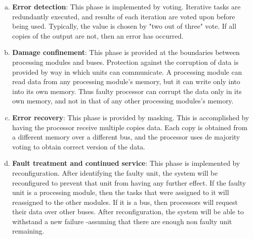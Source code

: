 \documentclass[12pt]{exam}
\begin{document}
\begin{questions}
    \begin{solution}
      \begin{enumerate}[(a)]
       \item \textbf{Error detection}: This phase is implemented by voting. Iterative tasks are redundantly executed, and results of each iteration are voted upon before being used. Typically, the value is chosen by "two out of three" vote. If all copies of the output are not, then an error has occurred.
       \item \textbf{Damage confinement}: This phase is provided at the boundaries between processing modules and buses. Protection against the corruption of data is provided by way in which units can communicate. A processing module can read data from any processing module's memory, but it can write only into into its own memory. Thus faulty processor can corrupt the data only in its own memory, and not in that of any other processing modules's memory.
       \item \textbf{Error recovery}: This phase is provided by masking. This is accomplished by having the processor receive multiple copies data. Each copy is obtained from a different memory over a different bus, and the processor uses de majority voting to obtain correct version of the data.
       \item \textbf{Fault treatment and continued service}: This phase is implemented by reconfiguration.  After identifying the faulty unit, the system will be reconfigured to prevent that unit from having any further effect. If the faulty unit is a processing module, then the tasks that were assigned to it will reassigned to the other modules. If it is a bus, then processors will request their data over other buses. After reconfiguration, the system will be able to withstand a new failure -assuming that there are enough non faulty unit remaining.
      \end{enumerate}

    \end{solution}

    
  \end{questions}
\end{document}
